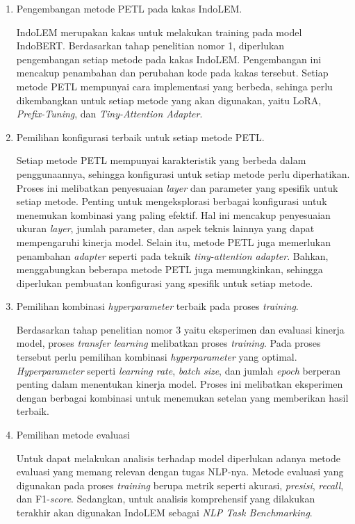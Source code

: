 \begin{enumerate}
    \item Pengembangan metode PETL pada kakas IndoLEM.
    
    IndoLEM merupakan kakas untuk melakukan training pada model IndoBERT. Berdasarkan tahap penelitian nomor 1, diperlukan pengembangan setiap metode pada kakas IndoLEM. Pengembangan ini mencakup penambahan dan perubahan kode pada kakas tersebut. Setiap metode PETL mempunyai cara implementasi yang berbeda, sehinga perlu dikembangkan untuk setiap metode yang akan digunakan, yaitu LoRA, \textit{Prefix-Tuning}, dan \textit{Tiny-Attention Adapter}.

    \item Pemilihan konfigurasi terbaik untuk setiap metode PETL.
    
    Setiap metode PETL mempunyai karakteristik yang berbeda dalam penggunaannya, sehingga konfigurasi untuk setiap metode perlu diperhatikan. Proses ini melibatkan penyesuaian \textit{layer} dan parameter yang spesifik untuk setiap metode. Penting untuk mengeksplorasi berbagai konfigurasi untuk menemukan kombinasi yang paling efektif. Hal ini mencakup penyesuaian ukuran \textit{layer}, jumlah parameter, dan aspek teknis lainnya yang dapat mempengaruhi kinerja model. Selain itu, metode PETL juga memerlukan penambahan \textit{adapter} seperti pada teknik \textit{tiny-attention adapter}. Bahkan, menggabungkan beberapa metode PETL juga memungkinkan, sehingga diperlukan pembuatan konfigurasi yang spesifik untuk setiap metode.

    \item Pemilihan kombinasi \textit{hyperparameter} terbaik pada proses \textit{training}.
    
    Berdasarkan tahap penelitian nomor 3 yaitu eksperimen dan evaluasi kinerja model, proses \textit{transfer learning} melibatkan proses \textit{training}. Pada proses tersebut perlu pemilihan kombinasi \textit{hyperparameter} yang optimal. \textit{Hyperparameter} seperti \textit{learning rate}, \textit{batch size}, dan jumlah \textit{epoch} berperan penting dalam menentukan kinerja model. Proses ini melibatkan eksperimen dengan berbagai kombinasi untuk menemukan setelan yang memberikan hasil terbaik. 
    
    \item Pemilihan metode evaluasi
    
    Untuk dapat melakukan analisis terhadap model diperlukan adanya metode evaluasi yang memang relevan dengan tugas NLP-nya. Metode evaluasi yang digunakan pada proses \textit{training} berupa metrik seperti akurasi, \textit{presisi}, \textit{recall}, dan F1-\textit{score}. Sedangkan, untuk analisis komprehensif yang dilakukan terakhir akan digunakan IndoLEM sebagai \textit{NLP Task Benchmarking}.

\end{enumerate}